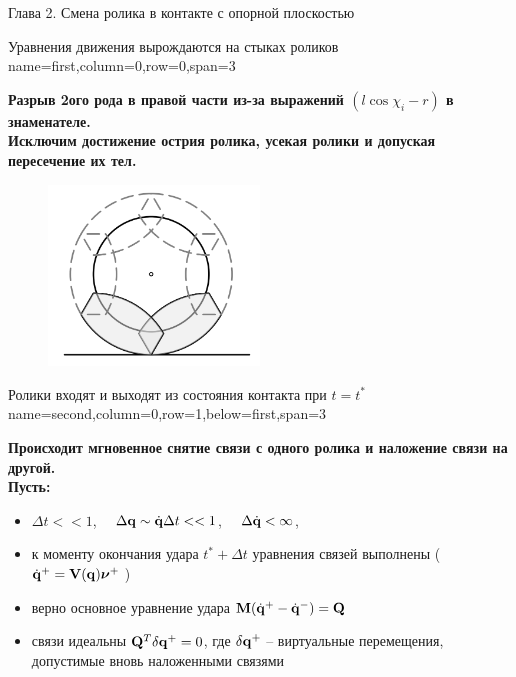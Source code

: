 \begin{myposter}{
    Глава 2. Смена ролика в контакте с опорной плоскостью
}

    \headerbox
    {Уравнения движения вырождаются на стыках роликов}
    {name=first,column=0,row=0,span=3}
    {
        {\huge\bf
            \vspace{10pt}
            Разрыв 2ого рода в правой части из-за выражений $(l\cos\chi_i-r)$ в знаменателе.\\
            Исключим достижение острия ролика, усекая ролики и допуская пересечение их тел.
            \begin{figure}[H]
                \centering
                \includegraphics[width=0.5\textwidth]{content/pic/asypng/pic_overlap.png}
            \end{figure}
            \vspace{10pt}
        }
    }
    
    \headerbox
    {Ролики входят и выходят из состояния контакта при $t = t^*$}
    {name=second,column=0,row=1,below=first,span=3}
    {
        {\huge\bf
            \vspace{10pt}
            Происходит мгновенное снятие связи с одного ролика и наложение связи на другой.\\
            Пусть:
            \begin{itemize}
                \item $\Delta t << 1$, $\quad \Delta \mathbf{q} \sim \dot{\mathbf{q}}\Delta t << 1$, $\quad \Delta \dot{\mathbf{q}} < \infty$,
                \item к моменту окончания удара $t^*+\Delta t$ уравнения связей выполнены (\enspace $\dot{\mathbf{q}}^+ = \mathbf{V}(\mathbf{q})\boldsymbol{\mathbf{\nu}}^+ \ $)
                \item верно основное уравнение удара \enspace $\mathbf{M} (\dot{\mathbf{q}}^+ - \dot{\mathbf{q}}^-) = \mathbf{Q}$
                \item связи идеальны \enspace $\mathbf{Q}^T\delta\mathbf{q}^+ = 0$, где $\delta\mathbf{q}^+$ -- виртуальные перемещения, допустимые вновь наложенными связями
            \end{itemize}
            \vspace{10pt}
        }
    }

\end{myposter}
